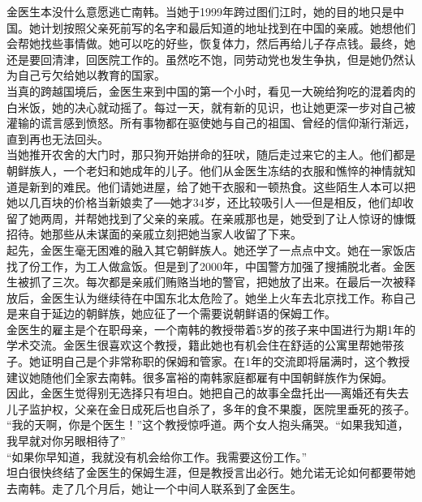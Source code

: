 金医生本没什么意愿逃亡南韩。当她于1999年跨过图们江时，她的目的地只是中国。她计划按照父亲死前写的名字和最后知道的地址找到在中国的亲戚。她想他们会帮她找些事情做。她可以吃的好些，恢复体力，然后再给儿子存点钱。最终，她还是要回清津，回医院工作的。虽然吃不饱，同劳动党也发生争执，但是她仍然认为自己亏欠给她以教育的国家。\\

当真的跨越国境后，金医生来到中国的第一个小时，看见一大碗给狗吃的混着肉的白米饭，她的决心就动摇了。每过一天，就有新的见识，也让她更深一步对自己被灌输的谎言感到愤怒。所有事物都在驱使她与自己的祖国、曾经的信仰渐行渐远，直到再也无法回头。\\

当她推开农舍的大门时，那只狗开始拼命的狂吠，随后走过来它的主人。他们都是朝鲜族人，一个老妇和她成年的儿子。他们从金医生冻结的衣服和憔悴的神情就知道是新到的难民。他们请她进屋，给了她干衣服和一顿热食。这些陌生人本可以把她以几百块的价格当新娘卖了──她才34岁，还比较吸引人──但是相反，他们却收留了她两周，并帮她找到了父亲的亲戚。在亲戚那也是，她受到了让人惊讶的慷慨招待。她那些从未谋面的亲戚立刻把她当家人收留了下来。\\

起先，金医生毫无困难的融入其它朝鲜族人。她还学了一点点中文。她在一家饭店找了份工作，为工人做盒饭。但是到了2000年，中国警方加强了搜捕脱北者。金医生被抓了三次。每次都是亲戚们贿赂当地的警官，把她放了出来。在最后一次被释放后，金医生认为继续待在中国东北太危险了。她坐上火车去北京找工作。称自己是来自于延边的朝鲜族，她应征了一个需要说朝鲜语的保姆工作。\\

金医生的雇主是个在职母亲，一个南韩的教授带着5岁的孩子来中国进行为期1年的学术交流。金医生很喜欢这个教授，籍此她也有机会住在舒适的公寓里帮她带孩子。她证明自己是个非常称职的保姆和管家。在1年的交流即将届满时，这个教授建议她随他们全家去南韩。很多富裕的南韩家庭都雇有中国朝鲜族作为保姆。\\

因此，金医生觉得别无选择只有坦白。她把自己的故事全盘托出──离婚还有失去儿子监护权，父亲在金日成死后也自杀了，多年的食不果腹，医院里垂死的孩子。\\

“我的天啊，你是个医生！”这个教授惊呼道。两个女人抱头痛哭。“如果我知道，我早就对你另眼相待了”\\

“如果你早知道，我就没有机会给你工作。我需要这份工作。”\\

坦白很快终结了金医生的保姆生涯，但是教授言出必行。她允诺无论如何都要带她去南韩。走了几个月后，她让一个中间人联系到了金医生。\\


